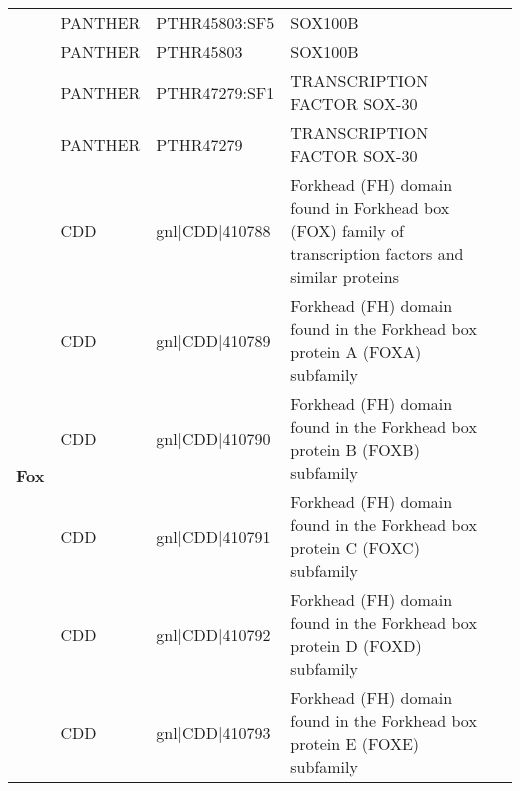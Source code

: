 \documentclass[../main.tex]{subfiles}
\begin{document}
\begin{landscape}
\begin{longtable}{@{}cllll@{}}
		                                & PANTHER              & PTHR45803:SF5   & SOX100B                                                                                                                                      & \\
		                                & PANTHER              & PTHR45803       & SOX100B                                                                                                                                      & \\
		                                & PANTHER              & PTHR47279:SF1   & TRANSCRIPTION FACTOR SOX-30                                                                                                                  & \\
		                                & PANTHER              & PTHR47279       & TRANSCRIPTION FACTOR SOX-30                                                                                                                  & \\* \midrule
		\multirow{33}{*}{\textbf{Fox}}  & CDD                  & gnl|CDD|410788  & Forkhead (FH) domain found in Forkhead box (FOX) family of transcription factors and similar proteins                                        & \\
		                                & CDD                  & gnl|CDD|410789  & Forkhead (FH) domain found in the Forkhead box protein A (FOXA) subfamily                                                                    & \\
		                                & CDD                  & gnl|CDD|410790  & Forkhead (FH) domain found in the Forkhead box protein B (FOXB) subfamily                                                                    & \\
		                                & CDD                  & gnl|CDD|410791  & Forkhead (FH) domain found in the Forkhead box protein C (FOXC) subfamily                                                                    & \\
		                                & CDD                  & gnl|CDD|410792  & Forkhead (FH) domain found in the Forkhead box protein D (FOXD) subfamily                                                                    & \\
		                                & CDD                  & gnl|CDD|410793  & Forkhead (FH) domain found in the Forkhead box protein E (FOXE) subfamily                                                                    & \\

\end{longtable}
\end{landscape}
\end{document}
